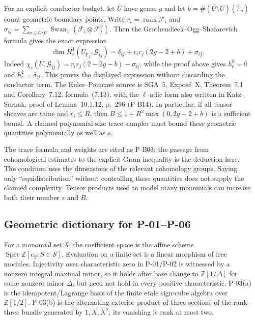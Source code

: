 \documentclass[11pt,a4paper]{article}
\theoremstyle{definition}\newtheorem{definition}{Definition}
\begin{document}
For an explicit conductor budget, let $\overline U$ have genus $g$ and let $b=\#(\overline U\setminus U)(\overline{\mathbb F}_q)$ count geometric boundary points. Write $r_i=\operatorname{rank}\mathcal F_i$ and $\sigma_{ij}=\sum_{x\in\overline U\setminus U}\operatorname{Swan}_x(\mathcal F_i\otimes\mathcal F_j^\vee)$. Then the Grothendieck--Ogg--Shafarevich formula gives the exact expression
\[
 \dim H_c^1(U_{\bar{\mathbb F}_q},\mathcal G_{ij})
 =\delta_{ij}+r_ir_j(2g-2+b)+\sigma_{ij}.
\]
Indeed $\chi_c(U,\mathcal G_{ij})=r_ir_j(2-2g-b)-\sigma_{ij}$, while the proof above gives $h_c^0=0$ and $h_c^2=\delta_{ij}$. This proves the displayed expression without discarding the conductor term. The Euler--Poincar\'e source is SGA~5, Expos\'e~X, Theorem~7.1 and Corollary~7.12, formula~(7.13), with the $\ell$-adic form also written in Katz--Sarnak, proof of Lemma~10.1.12, p.~296 (P-B14). In particular, if all tensor sheaves are tame and $r_i\le R$, then $B\le1+R^2\max(0,2g-2+b)$ is a sufficient bound. A claimed polynomial-size trace sampler must bound these geometric quantities polynomially as well as $s$.

The trace formula and weights are cited as P-B03; the passage from cohomological estimates to the explicit Gram inequality is the deduction here. The condition uses the dimensions of the relevant cohomology groups. Saying only ``equidistribution'' without controlling these quantities does not supply the claimed complexity. Tensor products used to model many monomials can increase both their number $s$ and $B$.

\subsection{Geometric dictionary for P-01--P-06}
For a monomial set $\mathcal S$, the coefficient space is the affine scheme $\operatorname{Spec}\mathbb Z[c_S:S\in\mathcal S]$. Evaluation on a finite set is a linear morphism of free modules. Injectivity over characteristic zero in P-01/P-02 is witnessed by a nonzero integral maximal minor, so it holds after base change to $\mathbb Z[1/\Delta]$ for some nonzero minor $\Delta$, but need not hold in every positive characteristic. P-03(a) is the idempotent/Lagrange basis of the finite etale sign-cube algebra over $\mathbb Z[1/2]$. P-03(b) is the alternating exterior product of three sections of the rank-three bundle generated by $1,X,X^2$; its vanishing is rank at most two.
\end{document}
